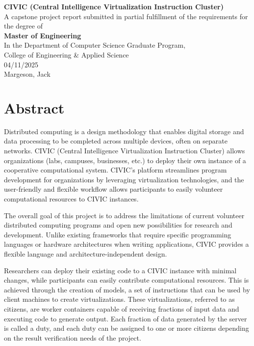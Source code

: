 \documentclass[11pt]{article}
\begin{document}
\thispagestyle{empty}
\begin{titlepage}
    \begin{center}
        \textbf{\Large CIVIC (Central Intelligence Virtualization Instruction Cluster)} \\[1cm]
        A capstone project report submitted in partial fulfillment of the requirements for the degree of \\[1cm]
        \textbf{\Large Master of Engineering} \\[1cm] 
        In the Department of Computer Science Graduate Program, \\
        College of Engineering \& Applied Science \\[1cm]
        04/11/2025 \\[1cm]
        Margeson, Jack
    \end{center}
\end{titlepage}

\setcounter{page}{2}
\section{Abstract}

Distributed computing is a design methodology that enables digital storage and data processing to be completed across multiple devices, often on separate networks. CIVIC (Central Intelligence Virtualization Instruction Cluster) allows organizations (labs, campuses, businesses, etc.) to deploy their own instance of a cooperative computational system. CIVIC’s platform streamlines program development for organizations by leveraging virtualization technologies, and the user-friendly and flexible workflow allows participants to easily volunteer computational resources to CIVIC instances.

The overall goal of this project is to address the limitations of current volunteer distributed computing programs and open new possibilities for research and development. Unlike existing frameworks that require specific programming languages or hardware architectures when writing applications, CIVIC provides a flexible language and architecture-independent design.

Researchers can deploy their existing code to a CIVIC instance with minimal changes, while participants can easily contribute computational resources. This is achieved through the creation of models, a set of instructions that can be used by client machines to create virtualizations. These virtualizations, referred to as citizens, are worker containers capable of receiving fractions of input data and executing code to generate output. Each fraction of data generated by the server is called a duty, and each duty can be assigned to one or more citizens depending on the result verification needs of the project.
\end{document}
